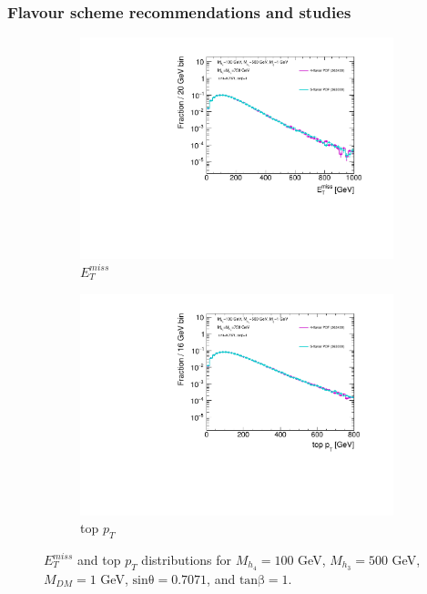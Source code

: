 \subsubsection{Flavour scheme recommendations and studies}
\begin{figure} \centering
  \begin{subfigure}[b]{0.49\textwidth}           
    \includegraphics[width=\textwidth]{texinputs/04_grid/figures/DMHF/4v5flavour/MDM_1_Ma_100_MA_500_sinp_0.7071_tanb_1.0_4F_v_5F/metlog.pdf}
    \caption{$E_{T}^{miss}$}
  \end{subfigure}
  \begin{subfigure}[b]{0.49\textwidth}
    \includegraphics[width=\textwidth]{texinputs/04_grid/figures/DMHF/4v5flavour/MDM_1_Ma_100_MA_500_sinp_0.7071_tanb_1.0_4F_v_5F/topptlog.pdf}
    \caption{top $p_{T}$}
  \end{subfigure}
  \caption{$E_{T}^{miss}$ and top $p_{T}$ distributions for $M_{h_{4}}=100$ GeV, $M_{h_{3}}=500$ GeV, $M_{DM}=1$ GeV, $\mathrm{sin\theta}=0.7071$, and $\mathrm{tan\beta}=1$.}
  \label{fig:4v5_Ma100_MA500}
\end{figure}

